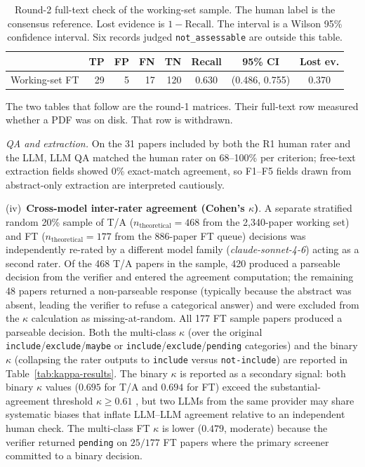 \begin{table}[htbp]
\centering
\caption{Round-2 full-text check of the working-set sample. The human label
is the consensus reference. Lost evidence is $1-\mathrm{Recall}$. The
interval is a Wilson 95\% confidence interval. Six records judged
\texttt{not\_assessable} are outside this table.}
\label{tab:r2-confusion}
\small
\begin{tabular}{lrrrrccc}
\toprule
 & TP & FP & FN & TN & Recall & 95\% CI & Lost ev. \\
\midrule
Working-set FT & 29 & 5 & 17 & 120 & 0.630 & (0.486, 0.755) & 0.370 \\
\bottomrule
\end{tabular}
\end{table}

The two tables that follow are the round-1 matrices. Their full-text row
measured whether a PDF was on disk. That row is withdrawn.

\emph{QA and extraction.} On the 31 papers included by both the R1 human
rater and the LLM, LLM QA matched the human rater on 68--100\% per
criterion; free-text extraction fields showed 0\% exact-match agreement, so
F1--F5 fields drawn from abstract-only extraction are interpreted
cautiously.




(iv)~\textbf{Cross-model inter-rater agreement (Cohen's $\kappa$)}.
A separate stratified random 20\% sample of T/A ($n_{\text{theoretical}} = 468$ from
the 2{,}340-paper working set) and FT ($n_{\text{theoretical}} = 177$ from
the 886-paper FT queue) decisions was independently re-rated by a different
model family (\textit{claude-sonnet-4-6}) acting as a second rater. Of the
468 T/A papers in the sample, 420 produced a parseable decision from the
verifier and entered the agreement computation; the remaining 48 papers
returned a non-parseable response (typically because the abstract was
absent, leading the verifier to refuse a categorical answer) and were
excluded from the $\kappa$ calculation as missing-at-random. All 177 FT
sample papers produced a parseable decision. Both the multi-class
$\kappa$ (over the original \texttt{include}/\texttt{exclude}/\texttt{maybe}
or \texttt{include}/\texttt{exclude}/\texttt{pending} categories) and the
binary $\kappa$ (collapsing the rater outputs to
\texttt{include} versus \texttt{not-include}) are reported in
Table~\ref{tab:kappa-results}. The binary $\kappa$ is reported as a
secondary signal: both binary $\kappa$ values ($0.695$ for T/A and $0.694$
for FT) exceed the substantial-agreement threshold $\kappa \geq 0.61$
\cite{landiskoch1977}, but two LLMs from the same provider may share
systematic biases that inflate LLM--LLM agreement relative to an independent
human check. The multi-class FT $\kappa$ is lower ($0.479$, moderate)
because the verifier returned \texttt{pending} on $25/177$ FT papers where
the primary screener committed to a binary decision.

